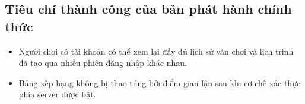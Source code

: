



\subsection{Tiêu chí thành công của bản phát hành chính thức}

\begin{itemize}[topsep=0pt, itemsep=2.5pt, leftmargin=1.5cm]
    \item Người chơi có tài khoản có thể xem lại đầy đủ lịch sử ván chơi và lịch trình đã tạo qua nhiều phiên đăng nhập khác nhau.
    \item Bảng xếp hạng không bị thao túng bởi điểm gian lận sau khi cơ chế xác thực phía server được bật.
\end{itemize}
